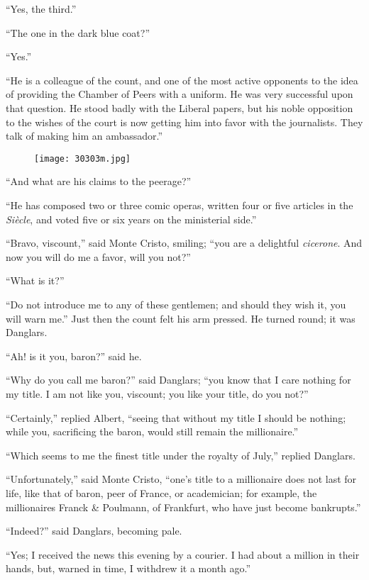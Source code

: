 “Yes, the third.”

“The one in the dark blue coat?”

“Yes.”

“He is a colleague of the count, and one of the most active opponents
to the idea of providing the Chamber of Peers with a uniform. He was
very successful upon that question. He stood badly with the Liberal
papers, but his noble opposition to the wishes of the court is now
getting him into favor with the journalists. They talk of making him an
ambassador.”

\begin{figure}[ht]
\texttt{[image: 30303m.jpg]}
\end{figure}

“And what are his claims to the peerage?”

“He has composed two or three comic operas, written four or five
articles in the \textit{Siècle}, and voted five or six years on the
ministerial side.”

“Bravo, viscount,” said Monte Cristo, smiling; “you are a delightful
\textit{cicerone}. And now you will do me a favor, will you not?”

“What is it?”

“Do not introduce me to any of these gentlemen; and should they wish
it, you will warn me.” Just then the count felt his arm pressed. He
turned round; it was Danglars.

“Ah! is it you, baron?” said he.

“Why do you call me baron?” said Danglars; “you know that I care
nothing for my title. I am not like you, viscount; you like your title,
do you not?”

“Certainly,” replied Albert, “seeing that without my title I should be
nothing; while you, sacrificing the baron, would still remain the
millionaire.”

“Which seems to me the finest title under the royalty of July,” replied
Danglars.

“Unfortunately,” said Monte Cristo, “one’s title to a millionaire does
not last for life, like that of baron, peer of France, or academician;
for example, the millionaires Franck \& Poulmann, of Frankfurt, who have
just become bankrupts.”

“Indeed?” said Danglars, becoming pale.

“Yes; I received the news this evening by a courier. I had about a
million in their hands, but, warned in time, I withdrew it a month
ago.”

